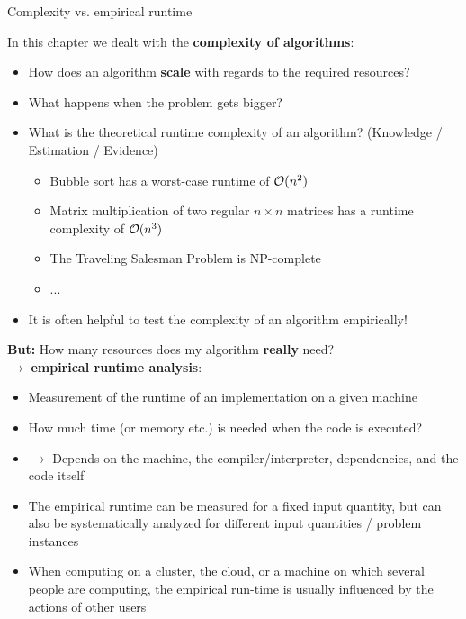 \documentclass[11pt,compress,t,notes=noshow, xcolor=table]{beamer}
\begin{document}
\begin{vbframe}{Complexity vs. empirical runtime}

In this chapter we dealt with the \textbf{complexity of algorithms}:

\begin{itemize}
\item How does an algorithm \textbf{scale} with regards to the required resources?
\item What happens when the problem gets bigger?
\item What is the theoretical runtime complexity of an algorithm? (Knowledge / Estimation / Evidence)
\begin{itemize}
\item Bubble sort has a worst-case runtime of $\mathcal{O}(n^2)$
\item Matrix multiplication of two regular $n\times n$ matrices has a runtime complexity of $\mathcal{O}(n^3)$
\item The Traveling Salesman Problem is NP-complete
\item ...
\end{itemize}
\item It is often helpful to test the complexity of an algorithm empirically!
\end{itemize}

\framebreak

\textbf{But:} How many resources does my algorithm \textbf{really} need?\\
$\to$ \textbf{empirical runtime analysis}:

\begin{itemize}
\item Measurement of the runtime of an implementation on a given machine
\item How much time (or memory etc.) is needed when the code is executed?
\item $\to$ Depends on the machine, the compiler/interpreter, dependencies, and the code itself
\item The empirical runtime can be measured for a fixed input quantity, but can also be systematically analyzed for different input quantities / problem instances
\item When computing on a cluster, the cloud, or a machine on which several people are computing, the empirical run-time is usually influenced by the actions of other users
\end{itemize}

\end{vbframe}

\endlecture
\end{document}
